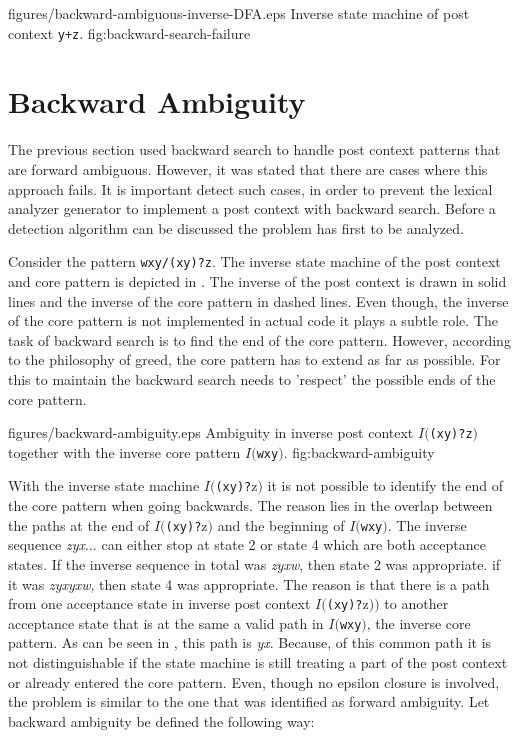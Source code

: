 \documentclass[acmtoplas]{acmtrans2m}
\newcommand{\finv}[1]{$I(${\sf #1}$)$}
\begin{document}
\showpic
{figures/backward-ambiguous-inverse-DFA.eps}
{Inverse state machine of post context {\tt y+z}.}
{fig:backward-search-failure}

\section{Backward Ambiguity}

The previous section used backward search to handle post context patterns
that are forward ambiguous. However, it was stated that there are cases where
this approach fails. It is important detect such cases, in order to
prevent the lexical analyzer generator to implement a post context
with backward search. Before a detection algorithm can be discussed
the problem has first to be analyzed. 

Consider the pattern {\tt wxy/(xy)?z}. The inverse state machine of the post
context and core pattern is depicted in . The inverse
of the post context is drawn in solid lines and the inverse of the 
core pattern in dashed lines. Even though, the inverse of the core pattern
is not implemented in actual code it plays a subtle role. The task
of backward search is to find the end of the core pattern. However, according
to the philosophy of greed, the core pattern has to extend as far as 
possible. For this to maintain the backward search needs to 'respect'
the possible ends of the core pattern. 

\showpic
{figures/backward-ambiguity.eps}
{Ambiguity in inverse post context $I(${\tt (xy)?z}$)$ together with the 
 inverse core pattern $I(${\tt wxy}$)$.}
{fig:backward-ambiguity}

With the inverse state machine $I(${\tt (xy)?}z$)$ it is not possible to
identify the end of the core pattern when going backwards. The reason lies in
the overlap between the paths at the end of $I(${\tt (xy)?}z$)$ and the
beginning of $I(${\tt wxy}$)$. The inverse sequence {\it zyx$\ldots$} can
either stop at state 2 or state 4 which are both acceptance states.  If the
inverse sequence in total was {\it zyxw}, then state 2 was appropriate.  if it
was {\it zyxyxw}, then state 4 was appropriate. The reason is that there is a
path from one acceptance state in inverse post context $I(${\tt (xy)?}z$))$ to
another acceptance state that is at the same a valid path in \finv{\tt wxy},
        the inverse core pattern.  As can be seen in
        , this path is {\it yx}.  Because, of this
        common path it is not distinguishable if the state machine is still
        treating a part of the post context or already entered the core
        pattern.  Even, though no epsilon closure is involved, the problem
        is similar to the one that was identified as forward ambiguity.  Let
        backward ambiguity be defined the following way:
\end{document}
